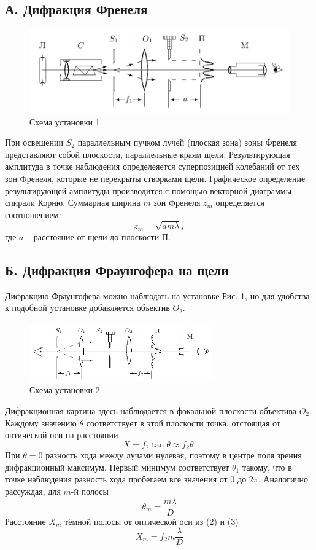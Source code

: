\documentclass{article}
\begin{document}
\subsection*{А. Дифракция Френеля}
\begin{figure}[h!]
	\includegraphics[scale=0.7]{0.png}
	\centering
	\caption{Схема установки 1.}
\end{figure}
При освещении $S_2$ параллельным пучком лучей (плоская зона) зоны Френеля представляют собой плоскости, параллельные краям щели. Результирующая амплитуда в точке наблюдения определеяется суперпозицией колебаний от тех зон Френеля, которые не перекрыты створками щели. Графическое определение результирующей амплитуды производится с помощью векторной диаграммы -- спирали Корню. Суммарная ширина $m$ зон Френеля $z_m$ определяется соотношением:
\begin{equation}
z_m = \sqrt{am\lambda},
\end{equation}
где $a$ -- расстояние от щели до плоскости П. 
\subsection*{Б. Дифракция Фраунгофера на щели}

Дифракцию Фраунгофера можно наблюдать на установке Рис. 1, но для удобства к подобной установке добавляется объектив $O_2$.

\begin{figure}[h!]
	\includegraphics[width = 0.7\textwidth]{3.png}
	\centering
	\caption{Схема установки 2.}
\end{figure}
Дифракционная картина здесь наблюдается в фокальной плоскости объектива $O_2$. Каждому значению $\theta$ соответствует в этой плоскости точка, отстоящая от оптической оси на расстоянии 
\begin{equation}
X = f_2 \tan \theta \approx f_2 \theta.
\end{equation}
При $\theta = 0$ разность хода между лучами нулевая, поэтому в центре поля зрения дифракционный максимум. Первый минимум соответствует $\theta_1$ такому, что в точке наблюдения разность хода пробегаем все значения от 0 до $2\pi$. Аналогично рассуждая, для $m$-й полосы
\begin{equation}
\theta_m = \frac{m \lambda}{D}
\end{equation}
Расстояние $X_m$ тёмной полосы от оптической оси из (2) и (3)
\begin{equation}
X_m = f_2m\frac{\lambda}{D}
\end{equation}
\end{document}
